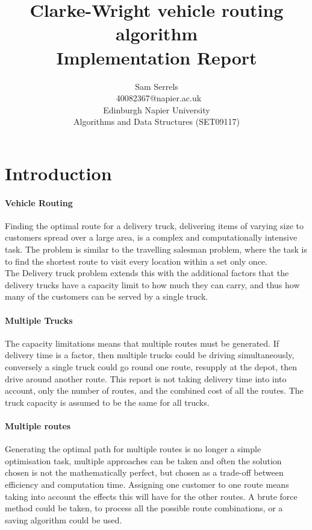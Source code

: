 \documentclass[conference]{acmsiggraph}
\title{Clarke-Wright vehicle routing algorithm\\
	   Implementation Report}
\author{Sam Serrels\\\ 40082367@napier.ac.uk \\
Edinburgh Napier University\\
Algorithms and Data Structures (SET09117)}
\begin{document}
\maketitle

\section{Introduction}

\paragraph{Vehicle Routing}
Finding the optimal route for a delivery truck, delivering items of varying size to customers spread over a large area, is a complex and computationally intensive task.
The problem is similar to the travelling salesman problem, where the task is to find the shortest route to visit every location within a set only once.\\
The Delivery truck problem extends this with the additional factors that the delivery trucks have a capacity limit to how much they can carry, and thus how many of the customers can be served by a single truck. 

\paragraph{Multiple Trucks}
The capacity limitations means that multiple routes must be generated. If delivery time is a factor, then multiple trucks could be driving simultaneously, conversely a single truck could go round one route, resupply at the depot, then drive around another route. This report is not taking delivery time into into account, only the number of routes, and the combined cost of all the routes. The truck capacity is assumed to be the same for all trucks.

\paragraph{Multiple routes}
Generating the optimal path for multiple routes is no longer a simple optimisation task, multiple approaches can be taken and often the solution chosen is not the mathematically perfect, but chosen as a trade-off between efficiency and computation time. Assigning one customer to one route means taking into account the effects this will have for the other routes. A brute force method could be taken, to process all the possible route combinations, or a saving algorithm could be used.
\end{document}
